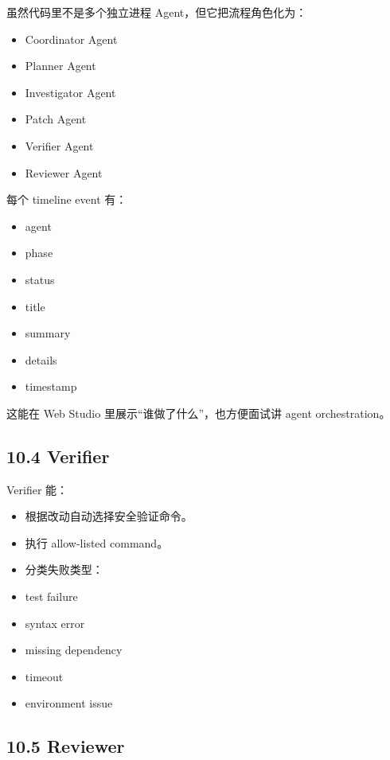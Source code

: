 \documentclass[UTF8,12pt,openany]{ctexbook}
\begin{document}
虽然代码里不是多个独立进程 Agent，但它把流程角色化为：\par

\begin{itemize}
\item Coordinator Agent
\item Planner Agent
\item Investigator Agent
\item Patch Agent
\item Verifier Agent
\item Reviewer Agent
\end{itemize}

每个 timeline event 有：\par

\begin{itemize}
\item agent
\item phase
\item status
\item title
\item summary
\item details
\item timestamp
\end{itemize}

这能在 Web Studio 里展示“谁做了什么”，也方便面试讲 agent orchestration。\par

\subsection{10.4 Verifier}

Verifier 能：\par

\begin{itemize}
\item 根据改动自动选择安全验证命令。
\item 执行 allow-listed command。
\item 分类失败类型：
\item test failure
\item syntax error
\item missing dependency
\item timeout
\item environment issue
\end{itemize}

\subsection{10.5 Reviewer}
\end{document}

